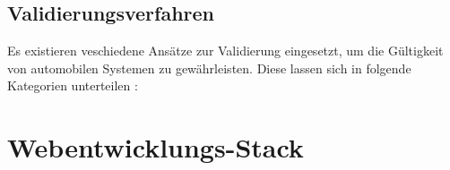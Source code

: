 \subsection*{Validierungsverfahren}

Es existieren veschiedene Ansätze zur Validierung eingesetzt, um die Gültigkeit von automobilen Systemen zu gewährleisten. Diese lassen sich in folgende Kategorien unterteilen\cite{kollmann2010comparative} \cite{venkitachalam2015} \cite{weissnegger2016automatic}:


\section{Webentwicklungs-Stack}